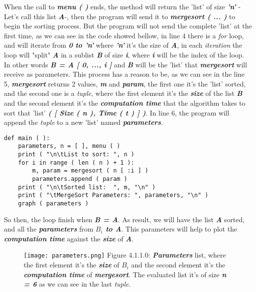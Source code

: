 When the call to {\bfseries\itshape menu ( )} ends, the method will return the 'list' of size {\bfseries\itshape 'n'} -Let's call this list {\bfseries\itshape A}-, then the program will send it to {\bfseries\itshape mergesort ( ... )} to begin the sorting process. But the program will not send the complete 'list' at the first time, as we can see in the code showed bellow, in line 4 there is a {\itshape for} loop, and will iterate from {\bfseries\itshape 0 to 'n'} where {\bfseries\itshape 'n'} it's the size of {\bfseries\itshape A}, in each {\itshape iteration} the loop will "split" {\bfseries\itshape A} in a sublist {\bfseries\itshape B} of size {\bfseries\itshape i}, where {\bfseries\itshape i} will be the index of the loop. In other words {\bfseries\itshape B = A [ 0, ..., i ]} and {\bfseries\itshape B} will be the 'list' that {\bfseries\itshape mergesort} will receive as parameters. This process has a reason to be, as we can see in the line 5, {\bfseries\itshape mergesort} returns 2 values, {\bfseries\itshape m} and {\bfseries\itshape param}, the first one it's the 'list' sorted, and the second one is a {\itshape tuple}, where the first element it's the {\bfseries\itshape size} of the list {\bfseries\itshape B} and the second element it's the {\bfseries\itshape computation time} that the algorithm takes to sort that 'list' {\bfseries\itshape ( [ Size ( n ), Time ( t ) ] )}. In line 6, the program will append the {\itshape tuple} to a new 'list' named {\bfseries\itshape parameters}. \hfill \break

\begin{lstlisting}
def main ( ):
    parameters, n = [ ], menu ( )
    print ( "\n\tList to sort: ", n )
    for i in range ( len ( n ) + 1 ):
        m, param = mergesort ( n [ :i ] )
        parameters.append ( param )
    print ( "\n\tSorted list:  ", m, "\n" )
    print ( "\tMergeSort Parameters: ", parameters, "\n" )
    graph ( parameters )
\end{lstlisting} \hfill

So then, the loop finish when {\bfseries\itshape B = A}. As result, we will have the list {\bfseries\itshape A} sorted, and all the {\bfseries\itshape parameters} from {\bfseries\itshape $B_{i}$ to A}. This parameters will help to plot the {\bfseries\itshape computation time} against the {\bfseries\itshape size} of {\bfseries\itshape A}.

\begin{figure}[H]
\texttt{[image: parameters.png]}
\centering \linebreak \linebreak Figure 4.1.1.0: {\bfseries\itshape Parameters} list, where the first element it's the {\bfseries\itshape size} of {\bfseries\itshape $B_{i}$} and the second element it's the {\bfseries\itshape computation time} of {\bfseries\itshape mergesort}. The evaluated list it's of size {\bfseries\itshape n = 6} as we can see in the last {\itshape tuple}.
\end{figure}

